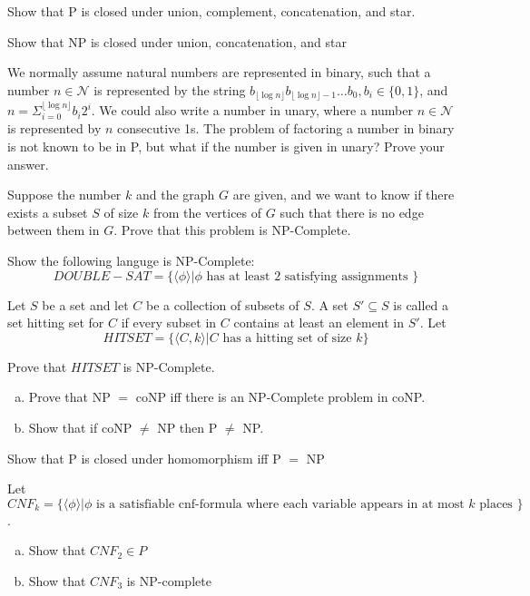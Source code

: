 \documentclass[12pt]{exam}
\begin{document}
\begin{questions}
\begin{solution}
\end{solution}


  \question{} %

  Show that P is closed under union, complement, concatenation, and star.


  \question{} %

  Show that NP is closed under union, concatenation, and star

  \question{} %

  We normally assume natural numbers are represented in binary, such that a number $n\in \mathcal{N}$ is represented by the string $b_{\lfloor\log n \rfloor}b_{\lfloor \log n \rfloor - 1} \dots b_{0}, b_{i} \in \{0,1\}$, and $n=\Sigma^{\lfloor \log n \rfloor}_{i=0}b_{i}2^{i}$.
  We could also write a number in unary, where a number $n\in \mathcal{N}$ is represented by $n$ consecutive 1s.
  The problem of factoring a number in binary is not known to be in P, but what if the number is given in unary?
  Prove your answer.


  \question{} %

  Suppose the number $k$ and the graph $G$ are given, and we want to know if there exists a subset $S$ of size $k$ from the vertices of $G$ such that there is no edge between them in $G$.
  Prove that this problem is NP-Complete.


  \question{} %

  Show the following languge is NP-Complete:
  \[DOUBLE-SAT=\{\langle \phi \rangle | \phi \text{ has at least 2 satisfying assignments }\}\]


  \question{} %

  Let $S$ be a set and let $C$ be a collection of subsets of $S$. A set $S'\subseteq S$ is called a set hitting set for $C$ if every subset in $C$ contains at least an element in $S'$. Let
  \[HITSET = \{\langle C,k \rangle | C \text{ has a hitting set of size } k\}\]

  Prove that $HITSET$ is NP-Complete.


  \question{} %

  \begin{enumerate}[a.]
    \item Prove that NP $=$ coNP iff there is an NP-Complete problem in coNP.
    \item Show that if coNP $\neq$ NP then P $\neq$ NP.

  \end{enumerate}


  \question{} %

  Show that P is closed under homomorphism iff P $=$ NP

  \question{} %

  Let $CNF_{k} = \{\langle \phi \rangle | \phi \text{ is a satisfiable cnf-formula where each variable appears in at most } k \text{ places }\}$.

  \begin{enumerate}[a.]
    \item Show that $CNF_{2} \in P$
    \item Show that $CNF_{3}$ is NP-complete
  \end{enumerate}


\end{questions}
\end{document}
